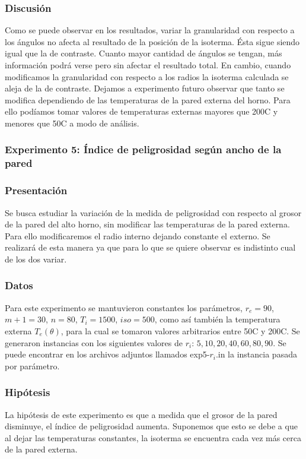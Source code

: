       \subsubsection*{Discusión}
        Como se puede observar en los resultados, variar la granularidad con respecto a los ángulos no afecta al resultado de la posición de la isoterma. Ésta sigue siendo igual que la de contraste. Cuanto mayor cantidad de ángulos se tengan, más información podrá verse pero sin afectar el resultado total. En cambio, cuando modificamos la granularidad con respecto a los radios la isoterma calculada se aleja de la de contraste. Dejamos a experimento futuro observar que tanto se modifica dependiendo de las temperaturas de la pared externa del horno. Para ello podíamos tomar valores de temperaturas externas mayores que 200{\degree}C y menores que 50{\degree}C a modo de análisis.


    \subsubsection*{Experimento 5: Índice de peligrosidad según ancho de la pared}

      \subsubsection*{Presentación}
        Se busca estudiar la variación de la medida de peligrosidad con respecto al grosor de la pared del alto horno, sin modificar las temperaturas de la pared externa. Para ello modificaremos el radio interno dejando constante el externo. Se realizará de esta manera ya que para lo que se quiere observar es indistinto cual de los dos variar. 

      \subsubsection*{Datos}
        Para este experimento se mantuvieron constantes los parámetros, $r_e = 90$, $m+1 = 30$, $n = 80$, $T_i = 1500$, $iso = 500$, como así también la temperatura externa $T_e(\theta)$, para la cual se tomaron valores arbitrarios entre 50{\degree}C y 200{\degree}C. Se generaron instancias con los siguientes valores de $r_i$: $5, 10, 20, 40, 60, 80, 90$.  Se puede encontrar en los archivos adjuntos llamados exp5-$r_i$.in la instancia pasada por parámetro.
     
      \subsubsection*{Hipótesis}
        La hipótesis de este experimento es que a medida que el grosor de la pared disminuye, el índice de peligrosidad aumenta. Suponemos que esto se debe a que al dejar las temperaturas constantes, la isoterma se encuentra cada vez más cerca de la pared externa.
        
